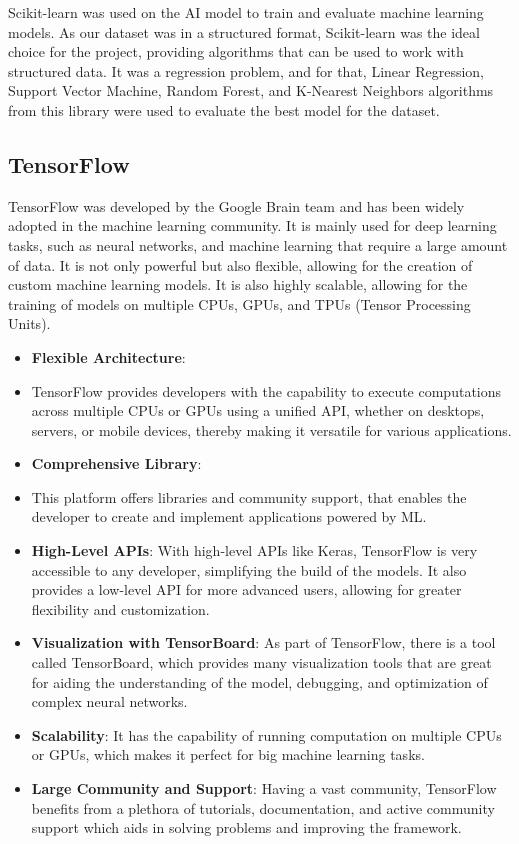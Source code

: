 Scikit-learn was used on the AI model to train and evaluate machine learning models. As our dataset was in a structured format, Scikit-learn was the ideal choice for the project, 
providing algorithms that can be used to work with structured data. It was a regression problem, and for that, Linear Regression, Support Vector Machine,
Random Forest, and K-Nearest Neighbors algorithms from this library were used to evaluate the best model for the dataset.

\subsection{TensorFlow}

TensorFlow was developed by the Google Brain team and has been widely adopted in the machine learning community. It is mainly used for deep learning tasks, such as neural networks, and machine
learning that require a large amount of data. It is not only powerful but also flexible, allowing for the creation of custom machine learning models. It is also highly scalable, allowing for 
the training of models on multiple CPUs, GPUs, and TPUs (Tensor Processing Units).\cite{tensorflow}

\begin{itemize}
    \item \textbf{Flexible Architecture}: 
    \item TensorFlow provides developers with the capability to execute computations across multiple CPUs or GPUs using a unified API, whether on desktops, servers, or mobile devices, thereby making it versatile for various applications.
    \item \textbf{Comprehensive Library}: 
    \item This platform offers libraries and community support, that enables the developer to create and implement applications powered by ML.
    \item \textbf{High-Level APIs}: With high-level APIs like Keras, TensorFlow is very accessible to any developer, simplifying the build of the models. It also provides a low-level API for more advanced users, allowing for greater flexibility and customization.
    \item \textbf{Visualization with TensorBoard}: As part of TensorFlow, there is a tool called TensorBoard, which provides many visualization tools that are great for aiding the understanding
    of the model, debugging, and optimization of complex neural networks.
    \item \textbf{Scalability}: It has the capability of running computation on multiple CPUs or GPUs, which makes it perfect for big machine learning tasks.
    \item \textbf{Large Community and Support}: Having a vast community, TensorFlow benefits from a plethora of tutorials, documentation, and active community support which aids in solving problems and improving the framework.
\end{itemize}

